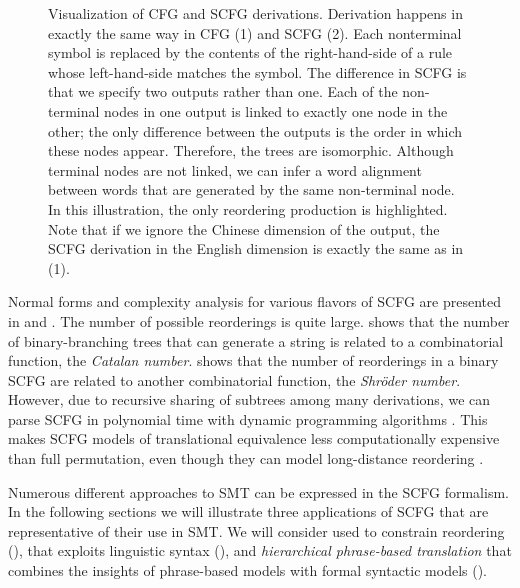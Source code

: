 \figpreamble
\begin{figure*}[t]
\figfontsize{\begin{center}

\end{center}}
\figpostamble
\caption[Visualization of CFG and SCFG derivations.]{\label{fig:cfg}Visualization of 
CFG and SCFG derivations.  Derivation
happens in exactly the same way in CFG (1) and SCFG (2).
Each nonterminal symbol is replaced by the contents of 
the right-hand-side of a rule whose left-hand-side matches
the symbol.  The difference in SCFG is that 
we specify two outputs rather than one.  Each of the 
non-terminal nodes in one output is linked to exactly one node 
in the other; the only difference between the outputs
is the order in which these nodes appear.  Therefore, 
the trees are isomorphic.  Although terminal nodes are
not linked, we can infer a word alignment between words
that are generated by the same non-terminal node.  In this
illustration, the only reordering production is highlighted.
Note that if we ignore the Chinese dimension of the 
output, the SCFG derivation in the English dimension is exactly
the same as in (1).}
\end{figure*}

Normal forms and complexity analysis
for various flavors of SCFG 
are presented in \citet{Aho:1969:css}
and \citet{Melamed:2003:naacl-main}.  
The number of possible reorderings
is quite large.  \citet{Church:1982:cl} shows that the
number of binary-branching trees that can generate a string is
related to a combinatorial
function, the {\em Catalan number}. \citet{Zens:2003:acl}
shows that the number of reorderings in a binary SCFG are related
to another combinatorial function, the {\em Shr\"{o}der number}.
However, due to recursive sharing of subtrees among many derivations, 
we can parse SCFG in polynomial time with
dynamic programming algorithms \citep{Melamed:2003:naacl-main}.
This makes SCFG models of translational equivalence 
less computationally expensive than 
full permutation, even though they can model long-distance
reordering \citep{Wu:1996:acl}. 

Numerous different approaches to SMT can be
expressed in the SCFG formalism.
In the following sections we will illustrate three 
applications of SCFG that are representative
of their use in SMT.  We will consider 
 used to constrain reordering 
(),
 that exploits linguistic syntax
(), and 
{\em hierarchical phrase-based translation} that combines
the insights of phrase-based models with formal syntactic models
().

